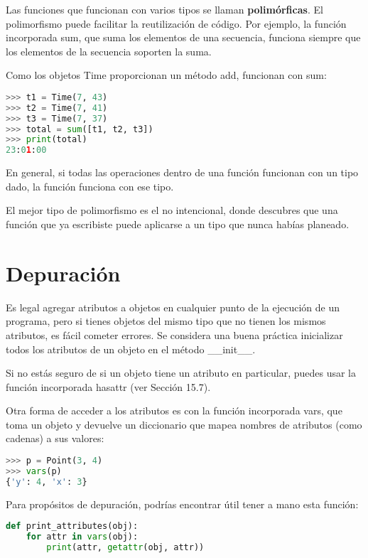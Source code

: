 Las funciones que funcionan con varios tipos se llaman \textbf{polimórficas}. El polimorfismo puede facilitar la reutilización de código. Por ejemplo, la función incorporada sum, que suma los elementos de una secuencia, funciona siempre que los elementos de la secuencia soporten la suma.

Como los objetos Time proporcionan un método add, funcionan con sum:

\begin{lstlisting}[language=Python]
>>> t1 = Time(7, 43)
>>> t2 = Time(7, 41)
>>> t3 = Time(7, 37)
>>> total = sum([t1, t2, t3])
>>> print(total)
23:01:00
\end{lstlisting}

En general, si todas las operaciones dentro de una función funcionan con un tipo dado, la función funciona con ese tipo.

El mejor tipo de polimorfismo es el no intencional, donde descubres que una función que ya escribiste puede aplicarse a un tipo que nunca habías planeado.

\section{Depuración}

Es legal agregar atributos a objetos en cualquier punto de la ejecución de un programa, pero si tienes objetos del mismo tipo que no tienen los mismos atributos, es fácil cometer errores. Se considera una buena práctica inicializar todos los atributos de un objeto en el método \_\_init\_\_.

Si no estás seguro de si un objeto tiene un atributo en particular, puedes usar la función incorporada hasattr (ver Sección 15.7).

Otra forma de acceder a los atributos es con la función incorporada vars, que toma un objeto y devuelve un diccionario que mapea nombres de atributos (como cadenas) a sus valores:

\begin{lstlisting}[language=Python]
>>> p = Point(3, 4)
>>> vars(p)
{'y': 4, 'x': 3}
\end{lstlisting}

Para propósitos de depuración, podrías encontrar útil tener a mano esta función:

\begin{lstlisting}[language=Python]
def print_attributes(obj):
    for attr in vars(obj):
        print(attr, getattr(obj, attr))
\end{lstlisting}

